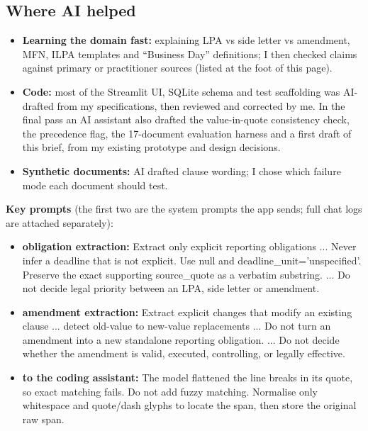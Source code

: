 \documentclass[10pt,a4paper]{article}
\begin{document}
\subsection{Where AI helped}\leavevmode
\begin{itemize}
  \item \textbf{Learning the domain fast:} explaining LPA vs side letter vs amendment, MFN, ILPA templates and ``Business Day'' definitions; I then checked claims against primary or practitioner sources (listed at the foot of this page).
  \item \textbf{Code:} most of the Streamlit UI, SQLite schema and test scaffolding was AI-drafted from my specifications, then reviewed and corrected by me. In the final pass an AI assistant also drafted the value-in-quote consistency check, the precedence flag, the 17-document evaluation harness and a first draft of this brief, from my existing prototype and design decisions.
  \item \textbf{Synthetic documents:} AI drafted clause wording; I chose which failure mode each document should test.
\end{itemize}
\textbf{Key prompts} (the first two are the system prompts the app sends; full chat logs are attached separately):
{\footnotesize\itshape\raggedright
\begin{itemize}[leftmargin=1em,label={\textbullet}]
\item {\upshape\bfseries obligation extraction:} Extract only explicit reporting obligations ... Never infer a deadline that is not explicit. Use null and deadline\_unit='unspecified'. Preserve the exact supporting source\_quote as a verbatim substring. ... Do not decide legal priority between an LPA, side letter or amendment.
\item {\upshape\bfseries amendment extraction:} Extract explicit changes that modify an existing clause ... detect old-value to new-value replacements ... Do not turn an amendment into a new standalone reporting obligation. ... Do not decide whether the amendment is valid, executed, controlling, or legally effective.
\item {\upshape\bfseries to the coding assistant:} The model flattened the line breaks in its quote, so exact matching fails. Do not add fuzzy matching. Normalise only whitespace and quote/dash glyphs to locate the span, then store the original raw span.
\end{itemize}}
\end{document}
